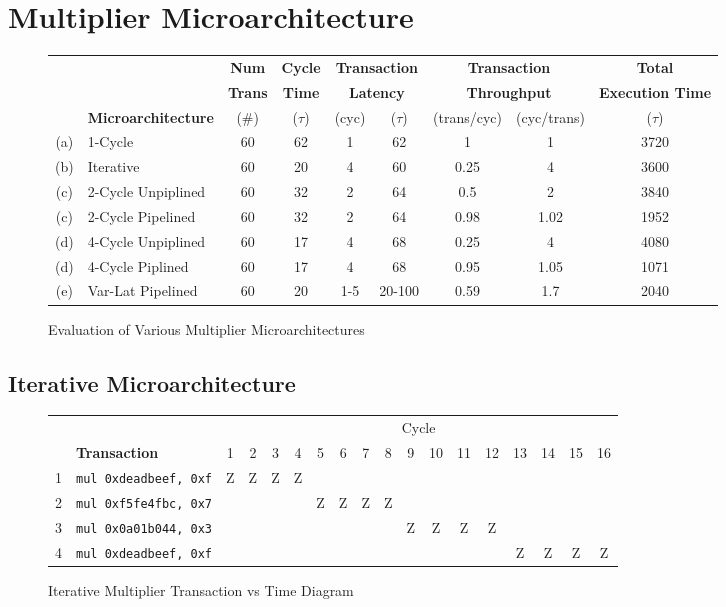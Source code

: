 \documentclass[10pt]{article}
\begin{document}
\section{Multiplier Microarchitecture}
\begin{figure}[H]
\centering
{\setlength{\tabcolsep}{2pt}
\begin{tabular}{@{\extracolsep{3pt}}clccccccc@{}}
\hline
& & \textbf{Num} & \textbf{Cycle} & \multicolumn{2}{c}{\textbf{Transaction}} & \multicolumn{2}{c}{\textbf{Transaction}} & \textbf{Total} \\
& & \textbf{Trans} &  \textbf{Time} & \multicolumn{2}{c}{\textbf{Latency}} & \multicolumn{2}{c}{\textbf{Throughput}} & \textbf{Execution Time} \\
\cline{3-3} 
\cline{4-4}
\cline{5-6}
\cline{7-8}
\cline{9-9}
& \textbf{Microarchitecture} & (\#) & ($\tau$) & (cyc) & ($\tau$) & (trans/cyc) & (cyc/trans) & ($\tau$) \\
\hline
(a) & 1-Cycle & 60 & 62 & 1 & 62 & 1 & 1 & 3720\\
\hline
(b) & Iterative & 60 & 20 & 4 & 60 & 0.25 & 4 & 3600\\
\hline
(c) & 2-Cycle Unpiplined & 60 & 32 & 2 & 64 & 0.5 & 2 & 3840\\
\hline
(c) & 2-Cycle Pipelined & 60 & 32 & 2 & 64 & 0.98 & 1.02 & 1952\\
\hline
(d) & 4-Cycle Unpiplined & 60 & 17 & 4 & 68 & 0.25 & 4 & 4080\\
\hline
(d) & 4-Cycle Piplined & 60 & 17 & 4 & 68 & 0.95 & 1.05 & 1071\\
\hline
(e) & Var-Lat Pipelined & 60 & 20 & 1-5 & 20-100 & 0.59 & 1.7 & 2040\\
\hline
\end{tabular}
}
\caption{Evaluation of Various Multiplier Microarchitectures}
\label{fig:mult_arch}
\end{figure}

\subsection{Iterative Microarchitecture}
\begin{figure}[H]
\centering
\begin{tabular}{cl|c|c|c|c|c|c|c|c|c|c|c|c|c|c|c|c}
\hline
& & \multicolumn{16}{c}{Cycle} \\
& \textbf{Transaction} & 1 & 2 & 3 & 4 & 5 & 6 & 7 & 8 & 9 & 10 & 11 & 12 & 13 & 14 & 15 & 16\\
\hline
1 & \texttt{mul 0xdeadbeef, 0xf} & Z & Z & Z & Z & & & & & & & & & & & &\\
\hline
2 & \texttt{mul 0xf5fe4fbc, 0x7} & & & & & Z & Z & Z & Z & & & & & & & &\\
\hline
3 & \texttt{mul 0x0a01b044, 0x3} & & & & & & & & & Z & Z & Z & Z & & & &\\
\hline
4 & \texttt{mul 0xdeadbeef, 0xf} & & & & & & & & & & & & & Z & Z & Z & Z\\
\hline
\end{tabular}
\caption{Iterative Multiplier Transaction vs Time Diagram}
\label{fig:iter_trans_diagram}
\end{figure}
\end{document}
